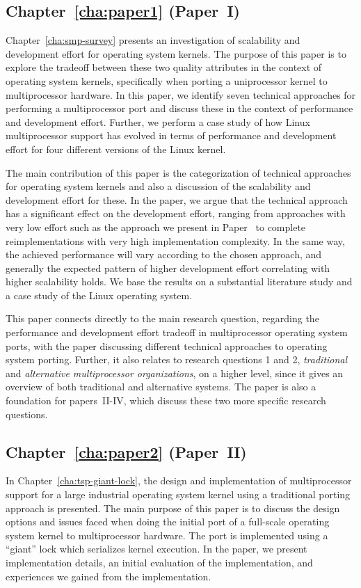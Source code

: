 \subsection{Chapter~\ref{cha:paper1} (Paper~I)}
Chapter~\ref{cha:smp-survey} presents an investigation of scalability and
development effort for operating system kernels. The purpose of this paper is
to explore the tradeoff between these two quality attributes in the context of
operating system kernels, specifically when porting a uniprocessor kernel to
multiprocessor hardware. In this paper, we identify seven technical approaches
for performing a multiprocessor port and discuss these in the context of
performance and development effort. Further, we perform a case study of how
Linux multiprocessor support has evolved in terms of performance and
development effort for four different versions of the Linux kernel.

The main contribution of this paper is the categorization of technical
approaches for operating system kernels and also a discussion of the
scalability and development effort for these. In the paper, we argue that the
technical approach has a significant effect on the development effort, ranging
from approaches with very low effort such as the approach we present in
Paper~ to complete reimplementations with very high
implementation complexity. In the same way, the achieved performance will vary
according to the chosen approach, and generally the expected pattern of higher
development effort correlating with higher scalability holds. We base the
results on a substantial literature study and a case study of the Linux
operating system.

This paper connects directly to the main research question, regarding the
performance and development effort tradeoff in multiprocessor operating system
ports, with the paper discussing different technical approaches to operating
system porting.  Further, it also relates to research questions 1 and 2,
\emph{traditional} and \emph{alternative multiprocessor organizations}, on a
higher level, since it gives an overview of both traditional and alternative
systems. The paper is also a foundation for papers~II-IV, which discuss these
two more specific research questions.

\subsection{Chapter~\ref{cha:paper2} (Paper~II)}
In Chapter~\ref{cha:tsp-giant-lock}, the design and implementation of
multiprocessor support for a large industrial operating system kernel using a
traditional porting approach is presented. The main purpose of this paper is
to discuss the design options and issues faced when doing the initial port of
a full-scale operating system kernel to multiprocessor hardware. The port is
implemented using a ``giant'' lock which serializes kernel execution. In the
paper, we present implementation details, an initial evaluation of the
implementation, and experiences we gained from the implementation.

